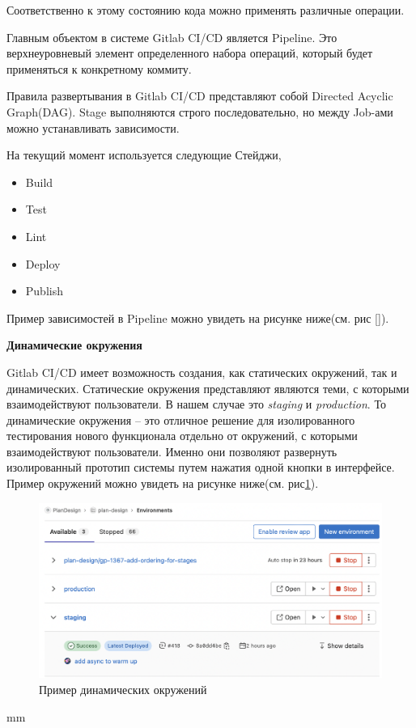 Соответственно к этому состоянию кода можно применять различные операции.

Главным объектом в системе Gitlab CI/CD является Pipeline.
Это верхнеуровневый элемент определенного набора операций, который будет применяться к конкретному коммиту.

Правила развертывания в Gitlab CI/CD представляют собой Directed Acyclic Graph(DAG).
Stage выполняются строго последовательно, но между Job-ами можно устанавливать зависимости.

На текущий момент используется следующие Стейджи,
\begin{itemize}
    \item Build
    \item Test
    \item Lint
    \item Deploy
    \item Publish
\end{itemize}

Пример зависимостей в Pipeline можно увидеть на рисунке ниже(см. рис []).

\vskip 10mm

\noindent \textbf{Динамические окружения}

Gitlab CI/CD имеет возможность создания, как статических окружений, так и динамических.
Статические окружения представляют являются теми, с которыми взаимодействуют пользователи.
В нашем случае это \textit{staging} и \textit{production}.
То динамические окружения -- это отличное решение для изолированного тестирования нового функционала
отдельно от окружений, с которыми взаимодействуют пользователи. Именно они позволяют развернуть
изолированный прототип системы путем нажатия одной кнопки в интерфейсе.
Пример окружений можно увидеть на рисунке ниже(см. рис\ref{pic:implementation__deployment-environment}).
\begin{figure}[H]
	\includegraphics[width=\textwidth]{implementation/pictures/deployment/environment}
	\caption{Пример динамических окружений}
	\label{pic:implementation__deployment-environment}
\end{figure}
 mm

